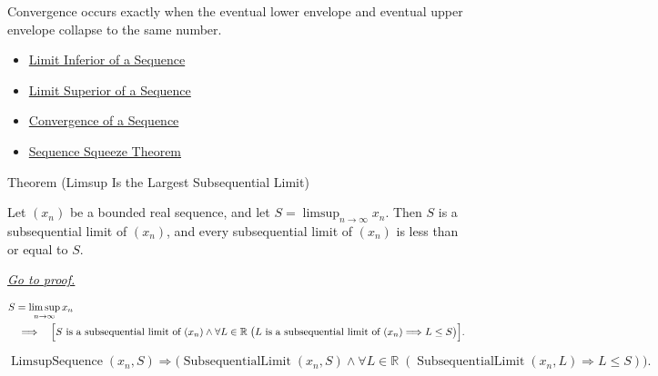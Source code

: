 \begin{remark*}[Interpretation]
Convergence occurs exactly when the eventual lower envelope and eventual
upper envelope collapse to the same number.
\end{remark*}

\begin{dependencies}
\begin{itemize}
  \item \hyperref[def:liminf-sequence]{Limit Inferior of a Sequence}
  \item \hyperref[def:limsup-sequence]{Limit Superior of a Sequence}
  \item \hyperref[def:convergent-sequence]{Convergence of a Sequence}
  \item \hyperref[thm:sequence-squeeze-theorem]{Sequence Squeeze Theorem}
\end{itemize}
\end{dependencies}


\begin{theorembox}{Theorem (Limsup Is the Largest Subsequential Limit)}
\begin{theorem}
\label{thm:limsup-largest-subsequential-limit}
Let $(x_n)$ be a bounded real sequence, and let
$S=\limsup_{n\to\infty}x_n$. Then $S$ is a subsequential limit of
$(x_n)$, and every subsequential limit of $(x_n)$ is less than or equal
to $S$.

\smallskip
\noindent
\hyperref[prf:limsup-largest-subsequential-limit]{\textit{Go to proof.}}
\end{theorem}
\end{theorembox}

\begin{remark*}
\[
\begin{aligned}
&S=\limsup_{n\to\infty}x_n\\
&\quad\Longrightarrow\quad
\Bigl[
  S\text{ is a subsequential limit of }(x_n)
  \land
  \forall L\in\mathbb{R}\;
  \bigl(L\text{ is a subsequential limit of }(x_n)\Longrightarrow L\le S\bigr)
\Bigr].
\end{aligned}
\]
\end{remark*}

\begin{remark*}
\[
\operatorname{LimsupSequence}(x_n,S)
\Longrightarrow
\bigl(
  \operatorname{SubsequentialLimit}(x_n,S)
  \land
  \forall L\in\mathbb{R}\;
  (\operatorname{SubsequentialLimit}(x_n,L)\Longrightarrow L\le S)
\bigr).
\]
\end{remark*}

